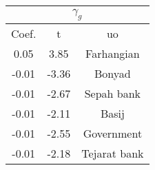     \begin{tabular}{ccc}
    \hline\hline
    \multicolumn{3}{c}{$\gamma_g$} \\
    \hline
    Coef. & t     & uo \\
    \hline
    0.05  & 3.85  & Farhangian \\
    -0.01 & -3.36 & Bonyad \\
    -0.01 & -2.67 & Sepah  bank \\
    -0.01 & -2.11 & Basij \\
    -0.01 & -2.55 & Government \\
    -0.01 & -2.18 & Tejarat bank \\
    \hline\hline
    \end{tabular}%